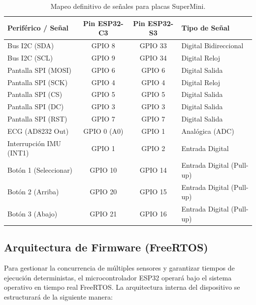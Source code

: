 \documentclass[letterpaper,11pt]{article}
\begin{document}
\begin{table}[H]
    \centering
    \begin{tabular}{|l|c|c|l|}
        \hline
        \rowcolor[HTML]{E5E7E9}
        \textbf{Periférico / Señal} & \textbf{Pin ESP32-C3} & \textbf{Pin ESP32-S3} & \textbf{Tipo de Señal}    \\ \hline
        Bus I2C (SDA)               & GPIO 8                & GPIO 33               & Digital Bidireccional     \\ \hline
        Bus I2C (SCL)               & GPIO 9                & GPIO 34               & Digital Reloj             \\ \hline
        Pantalla SPI (MOSI)         & GPIO 6                & GPIO 6                & Digital Salida            \\ \hline
        Pantalla SPI (SCK)          & GPIO 4                & GPIO 4                & Digital Reloj             \\ \hline
        Pantalla SPI (CS)           & GPIO 5                & GPIO 5                & Digital Salida            \\ \hline
        Pantalla SPI (DC)           & GPIO 3                & GPIO 3                & Digital Salida            \\ \hline
        Pantalla SPI (RST)          & GPIO 7                & GPIO 7                & Digital Salida            \\ \hline
        ECG (AD8232 Out)            & GPIO 0 (A0)           & GPIO 1                & Analógica (ADC)           \\ \hline
        Interrupción IMU (INT1)     & GPIO 1                & GPIO 2                & Entrada Digital           \\ \hline
        Botón 1 (Seleccionar)       & GPIO 10               & GPIO 14               & Entrada Digital (Pull-up) \\ \hline
        Botón 2 (Arriba)            & GPIO 20               & GPIO 15               & Entrada Digital (Pull-up) \\ \hline
        Botón 3 (Abajo)             & GPIO 21               & GPIO 16               & Entrada Digital (Pull-up) \\ \hline
    \end{tabular}
    \caption{Mapeo definitivo de señales para placas SuperMini.}
    \label{tab:pines}
\end{table}

\subsection{Arquitectura de Firmware (FreeRTOS)}
Para gestionar la concurrencia de múltiples sensores y garantizar tiempos de ejecución deterministas, el microcontrolador ESP32 operará bajo el sistema operativo en tiempo real FreeRTOS. La arquitectura interna del dispositivo se estructurará de la siguiente manera:
\end{document}
